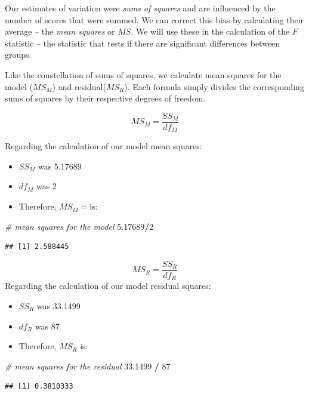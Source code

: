 \documentclass[
  english,
]{book}
\newenvironment{Shaded}{\begin{snugshade}}{\end{snugshade}}
\newcommand{\CommentTok}[1]{\textcolor[rgb]{0.56,0.35,0.01}{\textit{#1}}}
\newcommand{\DecValTok}[1]{\textcolor[rgb]{0.00,0.00,0.81}{#1}}
\newcommand{\FloatTok}[1]{\textcolor[rgb]{0.00,0.00,0.81}{#1}}
\newcommand{\OperatorTok}[1]{\textcolor[rgb]{0.81,0.36,0.00}{\textbf{#1}}}
\newcommand{\StringTok}[1]{\textcolor[rgb]{0.31,0.60,0.02}{#1}}
\providecommand{\tightlist}{%
  \setlength{\itemsep}{0pt}\setlength{\parskip}{0pt}}
\begin{document}
Our estimates of variation were \emph{sums of squares} and are influenced by the number of scores that were summed. We can correct this bias by calculating their average -- the \emph{mean squares} or \(MS\). We will use these in the calculation of the \(F\) statistic -- the statistic that tests if there are significant differences between groups.

Like the constellation of sums of squares, we calculate mean squares for the model (\(MS_M\)) and residual(\(MS_R\)). Each formula simply divides the corresponding sums of squares by their respective degrees of freedom.

\[MS_M = \frac{SS_{M}}{df{_{M}}}\]

Regarding the calculation of our model mean squares:

\begin{itemize}
\tightlist
\item
  \(SS_M\) was 5.17689
\item
  \(df_M\) was 2
\item
  Therefore, \(MS_M=\)is:
\end{itemize}

\begin{Shaded}
\begin{Highlighting}[]
\CommentTok{# mean squares for the model}
\FloatTok{5.17689}\OperatorTok{/}\DecValTok{2}
\end{Highlighting}
\end{Shaded}

\begin{verbatim}
## [1] 2.588445
\end{verbatim}

\[MS_R = \frac{SS_{R}}{df{_{R}}}\]
Regarding the calculation of our model residual squares:

\begin{itemize}
\tightlist
\item
  \(SS_R\) was 33.1499
\item
  \(df_R\) was 87
\item
  Therefore, \(MS_R\) is:
\end{itemize}

\begin{Shaded}
\begin{Highlighting}[]
\CommentTok{# mean squares for the residual}
\FloatTok{33.1499} \OperatorTok{/}\StringTok{ }\DecValTok{87}
\end{Highlighting}
\end{Shaded}

\begin{verbatim}
## [1] 0.3810333
\end{verbatim}
\end{document}

